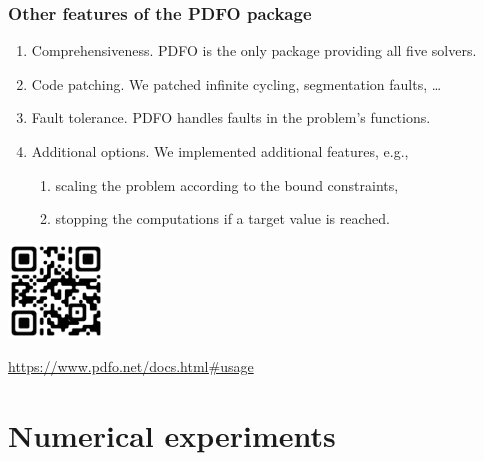 \documentclass{polyu-presentation}
\begin{document}
\begin{frame}
    \frametitle{Other features of the PDFO package}

    \begin{enumerate}
        \item \alert{Comprehensiveness}.
        PDFO is the only package providing all five solvers.
        \item \alert{Code patching}.
        We patched infinite cycling, segmentation faults, \dots
        \item \alert{Fault tolerance}.
        PDFO handles faults in the problem's functions.
        \item \alert{Additional options}. We implemented additional features, e.g.,
        \begin{enumerate}
            \item scaling the problem according to the bound constraints,
            \item stopping the computations if a target value is reached.
        \end{enumerate}
    \end{enumerate}

    \medskip

    \begin{center}
        \includegraphics[width=1in]{images/qr-codes/pdfo-usage.png}

        \footnotesize\url{https://www.pdfo.net/docs.html\#usage}
    \end{center}
\end{frame}

\section{Numerical experiments}
\end{document}
